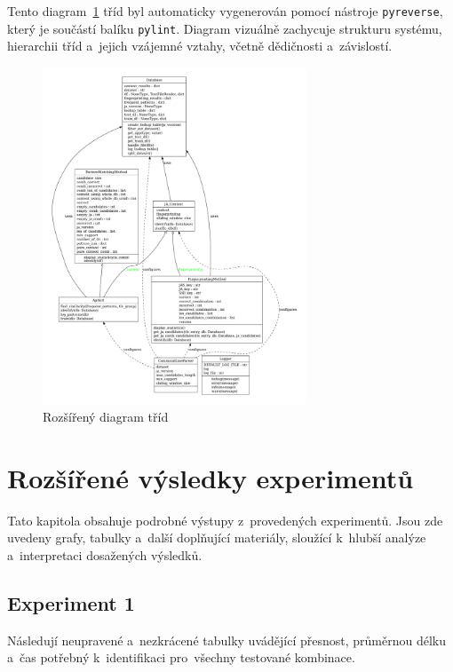 Tento diagram~\ref{fig:appendix-class} tříd byl automaticky vygenerován pomocí nástroje \texttt{pyreverse}, který je součástí balíku \texttt{pylint}. Diagram vizuálně zachycuje strukturu systému, hierarchii tříd a~jejich vzájemné vztahy, včetně dědičnosti a~závislostí.

\begin{figure}[H]
    \centering
    \includegraphics[width=0.7\textwidth]{obrazky-figures/class-dia-generated.pdf}
    \caption{Rozšířený diagram tříd}
    \label{fig:appendix-class}
\end{figure}

\chapter{Rozšířené výsledky experimentů}
\label{chp:appendix-experiments}
Tato kapitola obsahuje podrobné výstupy z~provedených experimentů. Jsou zde uvedeny grafy, tabulky a~další doplňující materiály, sloužící k~hlubší analýze a~interpretaci dosažených výsledků.

\section{Experiment 1}
\label{sec:appendix:ex1}

Následují neupravené a~nezkrácené tabulky uvádějící přesnost, průměrnou délku a~čas potřebný k~identifikaci pro~všechny testované kombinace.

